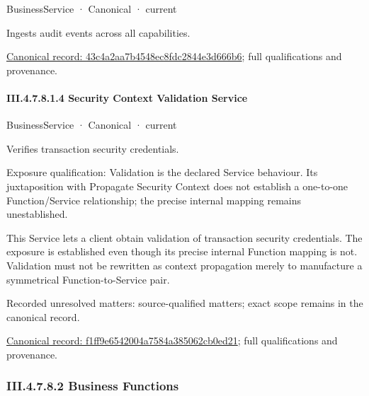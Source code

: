 \label{element:43c4a2aa7b4548ec8fdc2844e3d666b6}
{\small BusinessService · Canonical · current}\par

Ingests audit events across all capabilities.


{\footnotesize \href{../../../../../../../continuum/business/business-service/43c4a2aa7b4548ec8fdc2844e3d666b6.md}{Canonical record: 43c4a2aa7b4548ec8fdc2844e3d666b6}; full qualifications and provenance.}\par
\paragraph*{III.4.7.8.1.4 Security Context Validation Service}
\label{navigation:III.4.7.8.1.4}

\label{element:f1ff9e6542004a7584a385062cb0ed21}
{\small BusinessService · Canonical · current}\par

Verifies transaction security credentials.



Exposure qualification: Validation is the declared Service behaviour. Its juxtaposition with Propagate Security Context does not establish a one-to-one Function/Service relationship; the precise internal mapping remains unestablished.



This Service lets a client obtain validation of transaction security credentials. The exposure is established even though its precise internal Function mapping is not. Validation must not be rewritten as context propagation merely to manufacture a symmetrical Function-to-Service pair.


{\small Recorded unresolved matters: source-qualified matters; exact scope remains in the canonical record.}\par
{\footnotesize \href{../../../../../../../continuum/business/business-service/f1ff9e6542004a7584a385062cb0ed21.md}{Canonical record: f1ff9e6542004a7584a385062cb0ed21}; full qualifications and provenance.}\par
\subsubsection*{III.4.7.8.2 Business Functions}
\label{navigation:III.4.7.8.2}

